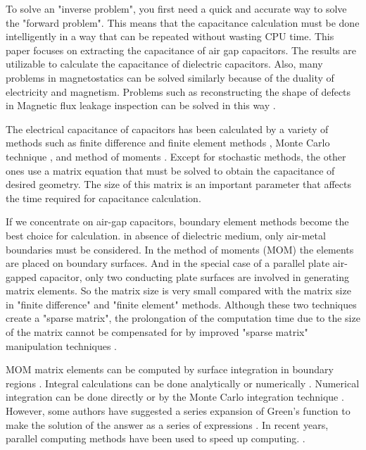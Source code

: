 \documentclass[final,5p,times,twocolumn]{elsarticle}
\begin{document}
To solve an "inverse problem", you first need a quick and accurate way to solve the "forward problem".  This means that the capacitance calculation must be done intelligently in a way that can be repeated without wasting CPU time. This paper focuses on extracting the capacitance of air gap capacitors. The results are utilizable to calculate the capacitance of dielectric capacitors. Also, many problems in magnetostatics can be solved similarly because of the duality of electricity and magnetism. Problems such as reconstructing the shape of defects in Magnetic flux leakage inspection can be solved in this way \cite{Dutta2008}.

The electrical capacitance of capacitors has been calculated by a variety of methods such as finite difference and finite element methods \cite{Izquierdo2009}, Monte Carlo technique \cite {LeCoZ1992, Song2020}, and method of moments \cite {Bai2004}. Except for stochastic methods, the other ones use a  matrix equation that must be solved to obtain the capacitance of desired geometry. The size of this matrix is an important parameter that affects the time required for capacitance calculation.

If we concentrate on air-gap capacitors, boundary element methods become the best choice for calculation. in  absence of dielectric medium, only air-metal boundaries must be considered. In the method of moments (MOM) the elements are placed on boundary surfaces. And in the special case of a parallel plate air-gapped capacitor, only two conducting plate surfaces are involved in generating matrix elements. So the matrix size is very small compared with the matrix size in "finite difference" and "finite element" methods. Although these two techniques create a "sparse matrix", the prolongation of the computation time due to the size of the matrix cannot be compensated for by improved "sparse matrix" manipulation techniques \cite{Liao2004, Kolundzija1998}.

MOM matrix elements can be computed by surface integration in boundary regions \cite {Tao2010}. Integral calculations can be done analytically \cite {Arcioni1997, Eibert1995, Wilton1984} or numerically \cite {Graglia1993, Rao1979}. Numerical integration can be done directly or by the Monte Carlo integration technique \cite {Mishra2009}. However, some authors have suggested a series expansion of Green's function to make the solution of the answer as a series of expressions \cite {Ayatollahi2003, Zhang2016, Hu2018, See2009}. In recent years, parallel computing methods have been used to speed up computing. \cite{Kolundzija2012, Manic2015}.
\end{document}
